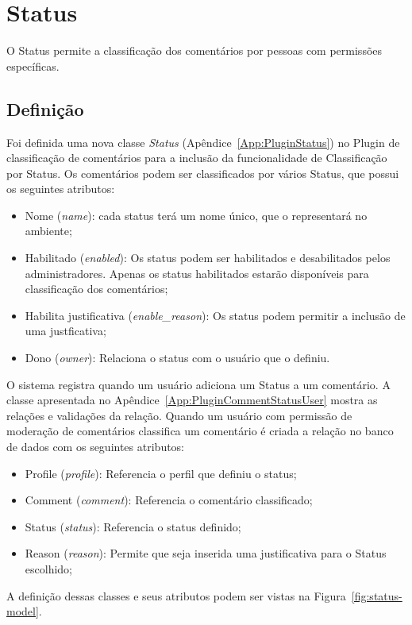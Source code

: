 \documentclass[11pt]{article}
\begin{document}
\section{Status}

O Status permite a classificação dos comentários por pessoas com
permissões específicas.


\subsection{Definição}

Foi definida uma nova classe {\it Status}
(Apêndice~\ref{App:PluginStatus}) no Plugin de classificação de
comentários para a inclusão da funcionalidade de Classificação por
Status. Os comentários podem ser classificados por vários Status, que possui os
seguintes atributos:
\begin{itemize}
  \item Nome ({\it name}): cada status terá um nome único, que o representará no
ambiente;
  \item Habilitado ({\it enabled}): Os status podem ser habilitados e
desabilitados pelos administradores. Apenas os status habilitados estarão
disponíveis para classificação dos comentários;
  \item Habilita justificativa ({\it enable\_reason}): Os status podem
permitir a inclusão de uma justficativa;
 \item Dono ({\it owner}): Relaciona o status com o usuário que o
definiu. 
\end{itemize}

O sistema registra quando um usuário adiciona um Status a um
comentário. A classe apresentada no
Apêndice~\ref{App:PluginCommentStatusUser} mostra as relações e
validações da relação. Quando um usuário com permissão de moderação de
comentários classifica um comentário é criada a relação no banco de
dados com os seguintes atributos:
\begin{itemize}
  \item Profile ({\it profile}): Referencia o perfil que definiu o
status;
  \item Comment ({\it comment}): Referencia o comentário classificado;
  \item Status ({\it status}): Referencia o status definido;
  \item Reason ({\it reason}): Permite que seja inserida uma
justificativa para o Status escolhido;
\end{itemize}

A definição dessas classes e seus atributos podem ser vistas na
Figura~\ref{fig:status-model}.
\end{document}
